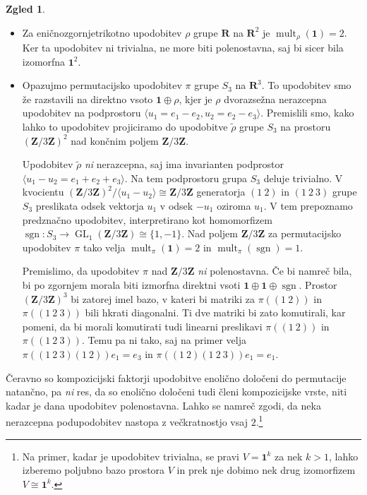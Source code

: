 \documentclass[11pt]{book}
\def\ZZ{\mathbf{Z}}
\def\RR{\mathbf{R}}
\def\11{\mathbf{1}}
\DeclareMathOperator\sgn{sgn}
\DeclareMathOperator\mult{mult}
\DeclareMathOperator\GL{GL}
\theoremstyle{definition}
\theoremstyle{zgled}
\newtheorem*{zgled}{Zgled}
\theoremstyle{odprtproblem}
\theoremstyle{domacanaloga}
\theoremstyle{izrek}
\begin{document}
\begin{zgled} \leavevmode
\begin{itemize}
    \item Za eničnozgornjetrikotno upodobitev $\rho$ grupe $\RR$ na $\RR^2$ je $\mult_{\rho}(\11) = 2$. Ker ta upodobitev ni trivialna, ne more biti polenostavna, saj bi sicer bila izomorfna $\11^2$.

    \item Opazujmo permutacijsko upodobitev $\pi$ grupe $S_3$ na $\RR^3$. To upodobitev smo že razstavili na direktno vsoto $\11 \oplus \rho$, kjer je $\rho$ dvorazsežna nerazcepna upodobitev na podprostoru $\langle u_1 = e_1 - e_2, u_2 = e_2 - e_3 \rangle$. Premislili smo, kako lahko to upodobitev projiciramo do upodobitve $\tilde \rho$ grupe $S_3$ na prostoru $(\ZZ/3\ZZ)^2$ nad končnim poljem $\ZZ/3\ZZ$. 

    Upodobitev $\tilde \rho$ \emph{ni} nerazcepna, saj ima invarianten podprostor $\langle u_1 - u_2 = e_1 + e_2 + e_3 \rangle$. Na tem podprostoru grupa $S_3$ deluje trivialno. V kvocientu $(\ZZ/3\ZZ)^2/\langle u_1 - u_2 \rangle \cong \ZZ/3\ZZ$ generatorja $(1\ 2)$ in $(1 \ 2 \ 3)$ grupe $S_3$ preslikata odsek vektorja $u_1$ v odsek $-u_1$ oziroma $u_1$. V tem prepoznamo predznačno upodobitev, interpretirano kot homomorfizem $\sgn \colon S_3 \to \GL_1(\ZZ/3\ZZ) \cong \{ 1, -1 \}$. Nad poljem $\ZZ/3\ZZ$ za permutacijsko upodobitev $\pi$ tako velja $\mult_{\pi}(\11) = 2$ in $\mult_{\pi}(\sgn) = 1$.

    Premislimo, da upodobitev $\pi$ nad $\ZZ/3\ZZ$ \emph{ni} polenostavna. Če bi namreč bila, bi po zgornjem morala biti izmorfna direktni vsoti $\11 \oplus \11 \oplus \sgn$. Prostor $(\ZZ/3\ZZ)^3$ bi zatorej imel bazo, v kateri bi matriki za $\pi((1 \ 2))$ in $\pi((1 \ 2 \ 3))$ bili hkrati diagonalni. Ti dve matriki bi zato komutirali, kar pomeni, da bi morali komutirati tudi linearni preslikavi $\pi((1 \ 2))$ in $\pi((1 \ 2 \ 3))$. Temu pa ni tako, saj na primer velja $\pi((1 \ 2 \ 3)(1 \ 2)) e_1 = e_3$ in $\pi((1 \ 2)(1 \ 2 \ 3)) e_1 = e_1$.
\end{itemize}
\end{zgled}

Čeravno so kompozicijski faktorji upodobitve enolično določeni do permutacije natančno, pa \emph{ni} res, da so enolično določeni tudi členi kompozicijske vrste, niti kadar je dana upodobitev polenostavna. Lahko se namreč zgodi, da neka nerazcepna podupodobitev nastopa z večkratnostjo vsaj $2$.\footnote{Na primer, kadar je upodobitev trivialna, se pravi $V = \11^k$ za nek $k > 1$, lahko izberemo poljubno bazo prostora $V$ in prek nje dobimo nek drug izomorfizem $V \cong \11^k$.} 
\end{document}
